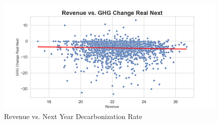 \begin{figure}[H]
\centering
  \includegraphics[width=\textwidth]{figures/revenue_vs_ghg_change_real_next.png}
\caption{Revenue vs. Next Year Decarbonization Rate}
\label{fig:revenue_vs_ghg_change_real_next}
\end{figure}


